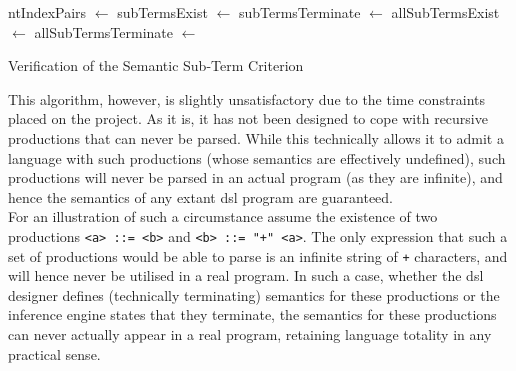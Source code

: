 \begin{algorithm}
\begin{algorithmic}
    \State ntIndexPairs $\gets$ 
    \State subTermsExist $\gets$ 
    \State subTermsTerminate $\gets$ 
    \State allSubTermsExist $\gets$ 
    \State allSubTermsTerminate $\gets$ 
        \State {}
    \Else
        \State {}
    \EndIf
\EndFunction
\end{algorithmic}
\caption{Verification of the Semantic Sub-Term Criterion}
\label{alg:verification_of_the_semantic_sub_term_criterion}
\end{algorithm}

This algorithm, however, is slightly unsatisfactory due to the time constraints placed on the project. 
As it is, it has not been designed to cope with recursive productions that can never be parsed. 
While this technically allows it to admit a language with such productions (whose semantics are effectively undefined), such productions will never be parsed in an actual program (as they are infinite), and hence the semantics of any extant \gls{dsl} program are guaranteed.\\

For an illustration of such a circumstance assume the existence of two productions \texttt{<a> ::= <b>} and \texttt{<b> ::= "+" <a>}. 
The only expression that such a set of productions would be able to parse is an infinite string of \texttt{+} characters, and will hence never be utilised in a real program.
In such a case, whether the \gls{dsl} designer defines (technically terminating) semantics for these productions or the inference engine states that they terminate, the semantics for these productions can never actually appear in a real program, retaining language totality in any practical sense. 


